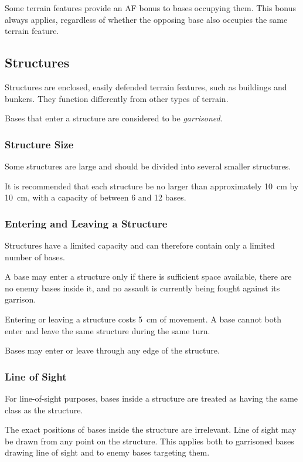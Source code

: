 Some terrain features provide an AF bonus to bases occupying them. This bonus always applies, regardless of whether the opposing base also occupies the same terrain feature.

\subsection{Structures}

Structures are enclosed, easily defended terrain features, such as buildings and bunkers. They function differently from other types of terrain.

Bases that enter a structure are considered to be \textit{garrisoned}.

\subsubsection{Structure Size}

Some structures are large and should be divided into several smaller structures.

It is recommended that each structure be no larger than approximately 10~cm by 10~cm, with a capacity of between 6 and 12 bases.

\subsubsection{Entering and Leaving a Structure}

Structures have a limited capacity and can therefore contain only a limited number of bases.

A base may enter a structure only if there is sufficient space available, there are no enemy bases inside it, and no assault is currently being fought against its garrison.

Entering or leaving a structure costs 5~cm of movement. A base cannot both enter and leave the same structure during the same turn.

Bases may enter or leave through any edge of the structure.

\subsubsection{Line of Sight}

For line-of-sight purposes, bases inside a structure are treated as having the same class as the structure.

The exact positions of bases inside the structure are irrelevant. Line of sight may be drawn from any point on the structure. This applies both to garrisoned bases drawing line of sight and to enemy bases targeting them.

